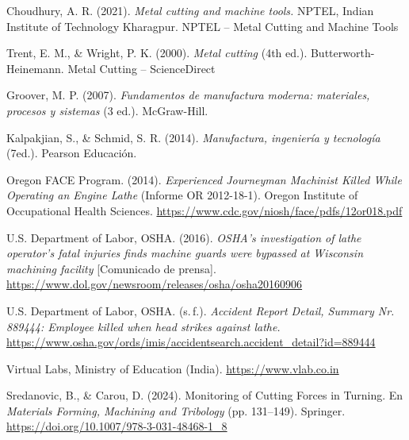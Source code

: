 \documentclass[12pt,a4paper]{article}
\begin{document}
\begin{enumerate}[label={[\arabic*]},ref=\arabic*,leftmargin=2.2em,itemsep=2pt]
	\item Choudhury, A. R. (2021). \emph{Metal cutting and machine tools.} NPTEL,
	      Indian Institute of Technology Kharagpur. NPTEL – Metal Cutting and
	      Machine Tools\\[-8pt]
	\item Trent, E. M., \& Wright, P. K. (2000). \emph{Metal cutting} (4th ed.).
	      Butterworth-Heinemann. Metal Cutting – ScienceDirect\\[-8pt]
	\item Groover, M. P. (2007). \emph{Fundamentos de
		      manufactura moderna: materiales, procesos y sistemas} (3\textdegree
	      ed.). McGraw-Hill.\\[-8pt]
	\item Kalpakjian, S., \& Schmid, S. R. (2014).
	      \emph{Manufactura, ingeniería y tecnología} (7\textdegree ed.). Pearson
	      Educación.\\[-8pt]
	\item Oregon FACE Program. (2014). \emph{Experienced
		      Journeyman Machinist Killed While Operating an Engine Lathe} (Informe
	      OR 2012-18-1). Oregon Institute of Occupational Health Sciences.
	      \url{https://www.cdc.gov/niosh/face/pdfs/12or018.pdf}\\[-8pt]
	\item U.S. Department of Labor, OSHA. (2016). \emph{OSHA's
		      investigation of lathe operator's fatal injuries finds machine guards
		      were bypassed at Wisconsin machining facility} [Comunicado de prensa].
	      \url{https://www.dol.gov/newsroom/releases/osha/osha20160906}\\[-8pt]
	\item U.S. Department of Labor, OSHA. (s.\,f.).
	      \emph{Accident
		      Report Detail, Summary Nr. 889444: Employee killed when head strikes
		      against lathe.}
	      \url{https://www.osha.gov/ords/imis/accidentsearch.accident_detail?id=889444}\\[-8pt]
	\item Virtual Labs, Ministry of Education (India).
	      \url{https://www.vlab.co.in}\\[-8pt]
	\item Sredanovic, B., \& Carou, D. (2024). Monitoring of
	      Cutting Forces in Turning. En \emph{Materials Forming, Machining and
		      Tribology} (pp. 131--149). Springer.
	      \url{https://doi.org/10.1007/978-3-031-48468-1_8}
\end{enumerate}
\end{document}
